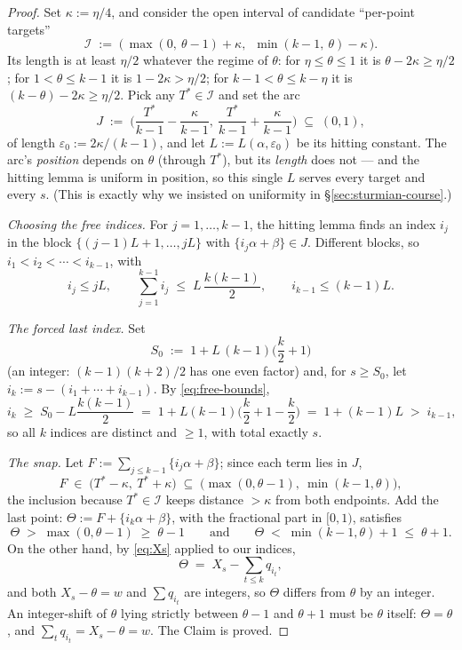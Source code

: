 \documentclass[11pt,reqno]{amsart}
\theoremstyle{plain}
\theoremstyle{definition}
\theoremstyle{remark}
\begin{document}
\begin{proof}
Set $\kappa := \eta/4$, and consider the open interval of candidate ``per-point
targets''
\[
  \mathcal{I} \;:=\; \big(\, \max(0,\ \theta - 1) + \kappa,\ \; \min(k-1,\ \theta)
  - \kappa \,\big) .
\]
Its length is at least $\eta/2$ whatever the regime of $\theta$: for $\eta \le
\theta \le 1$ it is $\theta - 2\kappa \ge \eta/2$; for $1 < \theta \le k-1$ it is
$1 - 2\kappa > \eta/2$; for $k - 1 < \theta \le k - \eta$ it is $(k - \theta) -
2\kappa \ge \eta/2$. Pick any $T^* \in \mathcal{I}$ and set the arc
\[
  J \;:=\; \Big( \frac{T^*}{k-1} - \frac{\kappa}{k-1},\ \frac{T^*}{k-1} +
  \frac{\kappa}{k-1} \Big) \;\subseteq\; (0,1),
\]
of length $\varepsilon_0 := 2\kappa/(k-1)$, and let $L := L(\alpha, \varepsilon_0)$
be its hitting constant. The arc's \emph{position} depends on $\theta$ (through
$T^*$), but its \emph{length} does not --- and the hitting lemma is uniform in
position, so this single $L$ serves every target and every $s$. (This is exactly
why we insisted on uniformity in \S\ref{sec:sturmian-course}.)

\emph{Choosing the free indices.} For $j = 1, \dots, k-1$, the hitting lemma finds
an index $i_j$ in the block $\{(j-1)L + 1, \dots, jL\}$ with
$\{i_j \alpha + \beta\} \in J$. Different blocks, so $i_1 < i_2 < \cdots <
i_{k-1}$, with
\begin{equation}\label{eq:free-bounds}
  i_j \le jL, \qquad \sum_{j=1}^{k-1} i_j \;\le\; L\,\frac{k(k-1)}{2}, \qquad
  i_{k-1} \le (k-1)L .
\end{equation}

\emph{The forced last index.} Set
\[
  S_0 \;:=\; 1 + L\,(k-1)\Big(\frac{k}{2} + 1\Big)
\]
(an integer: $(k-1)(k+2)/2$ has one even factor) and, for $s \ge S_0$, let
$i_k := s - (i_1 + \cdots + i_{k-1})$. By \eqref{eq:free-bounds},
\[
  i_k \;\ge\; S_0 - L\frac{k(k-1)}{2} \;=\; 1 + L(k-1)\Big(\frac k2 + 1 - \frac
  k2\Big) \;=\; 1 + (k-1)L \;>\; i_{k-1} ,
\]
so all $k$ indices are distinct and $\ge 1$, with total exactly $s$.

\emph{The snap.} Let $F := \sum_{j \le k-1} \{i_j\alpha + \beta\}$; since each term
lies in $J$,
\[
  F \;\in\; \big( T^* - \kappa,\ T^* + \kappa \big) \;\subseteq\;
  \big( \max(0, \theta - 1),\ \min(k-1, \theta) \big),
\]
the inclusion because $T^* \in \mathcal{I}$ keeps distance $> \kappa$ from both
endpoints. Add the last point: $\Theta := F + \{i_k \alpha + \beta\}$, with the
fractional part in $[0, 1)$, satisfies
\[
  \Theta \;>\; \max(0, \theta - 1) \;\ge\; \theta - 1
  \qquad\text{and}\qquad
  \Theta \;<\; \min(k-1, \theta) + 1 \;\le\; \theta + 1 .
\]
On the other hand, by \eqref{eq:Xs} applied to our indices,
\[
  \Theta \;=\; X_s - \sum_{t \le k} q_{i_t} ,
\]
and both $X_s - \theta = w$ and $\sum q_{i_t}$ are integers, so $\Theta$ differs
from $\theta$ by an integer. An integer-shift of $\theta$ lying strictly between
$\theta - 1$ and $\theta + 1$ must be $\theta$ itself: $\Theta = \theta$, and
$\sum_t q_{i_t} = X_s - \theta = w$. The Claim is proved.


\end{proof}
\end{document}
